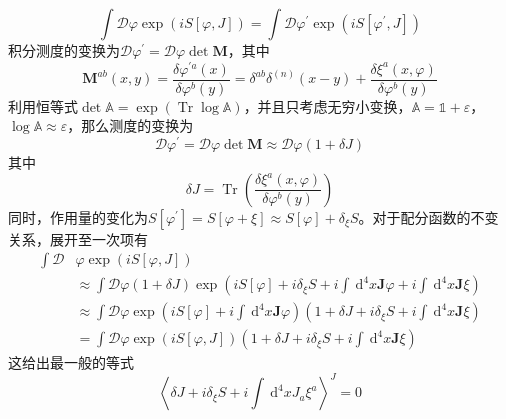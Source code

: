 \documentclass[10pt,openany]{book}
\theoremstyle{thmstyle} %
\theoremstyle{defstyle} %
\theoremstyle{prostyle} %
\begin{document}
\begin{equation*}
  \int \mathcal{D} \varphi \exp (i S[\varphi, J])=\int \mathcal{D} \varphi^{\prime} \exp \left(i S\left[\varphi^{\prime}, J\right]\right)
\end{equation*}
积分测度的变换为$ \mathcal{D} \varphi^{\prime}=\mathcal{D} \varphi \operatorname{det} \boldsymbol{M} $，其中
\begin{equation*}
  \boldsymbol{M}^{a b}(x, y)=\frac{\delta \varphi^{\prime a}(x)}{\delta \varphi^b(y)}=\delta^{a b} \delta^{(n)}(x-y)+\frac{\delta \xi^a(x, \varphi)}{\delta \varphi^b(y)}
\end{equation*}
利用恒等式$ \operatorname{det} \mathbb{A}=\exp (\operatorname{Tr} \log \mathbb{A}) $，并且只考虑无穷小变换，$ \mathbb{A}=\mathbb{1}+\varepsilon $，$ \log \mathbb{A} \approx \varepsilon $，那么测度的变换为
\begin{equation*}
  \mathcal{D} \varphi^{\prime}=\mathcal{D} \varphi \operatorname{det} \boldsymbol{M} \approx \mathcal{D} \varphi(1+\delta J)
\end{equation*}
其中
\begin{equation*}
  \delta J=\operatorname{Tr}\left(\frac{\delta \xi^a(x, \varphi)}{\delta \varphi^b(y)}\right)
\end{equation*}
同时，作用量的变化为$ S\left[\varphi^{\prime}\right]=S[\varphi+\xi] \approx S[\varphi]+\delta_{\xi} S $。对于配分函数的不变关系，展开至一次项有
\begin{equation}
  \begin{aligned}
    \int \mathcal{D} & \varphi \exp (i S[\varphi, J]) \\
    & \approx \int \mathcal{D} \varphi(1+\delta J) \exp \left(i S[\varphi]+i \delta_{\xi} S+i \int \mathrm{~d}^4 x \boldsymbol{J} \varphi+i \int \mathrm{~d}^4 x \boldsymbol{J} \xi\right) \\
    & \approx \int \mathcal{D} \varphi \exp \left(i S[\varphi]+i \int \mathrm{~d}^4 x \boldsymbol{J} \varphi\right)\left(1+\delta J+i \delta_{\xi} S+i \int \mathrm{~d}^4 x \boldsymbol{J} \xi\right) \\
    & =\int \mathcal{D} \varphi \exp (i S[\varphi, J])\left(1+\delta J+i \delta_{\xi} S+i \int \mathrm{~d}^4 x \boldsymbol{J} \xi\right)
    \end{aligned}
\end{equation}
这给出最一般的等式
\begin{equation}
  \left\langle\delta J+i \delta_{\xi} S+i \int \mathrm{~d}^4 x J_a \xi^a\right\rangle^J=0
  \label{general identity}
\end{equation}
\end{document}
